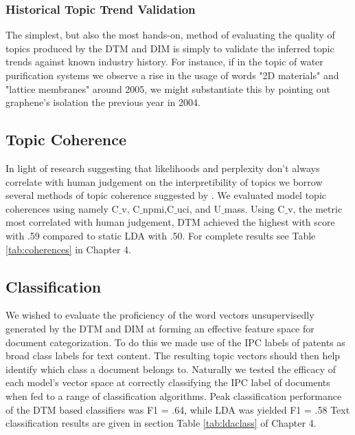 \subsubsection{Historical Topic Trend Validation}
The simplest, but also the most hands-on, method of evaluating the quality of topics produced by the DTM and DIM is simply to validate the inferred topic trends against known industry history. For instance, if in the topic of water purification systems we observe a rise in the usage of words "2D materials" and "lattice membranes" around 2005, we might substantiate this by pointing out graphene's isolation the previous year in 2004.
 

\subsection{Topic Coherence}
In light of research suggesting that likelihoods and perplexity don't always correlate with human judgement on the interpretibility of topics \parencite{Blei:2006:DTM:1143844.1143859} we borrow several methods of topic coherence suggested by \parencite{DBLP:journals/corr/RosnerHRNB14}. We evaluated model topic coherences using namely C$\_$v, C$\_$npmi,C$\_$uci, and U$\_$mass. Using C$\_$v, the metric most correlated with human judgement, DTM achieved the highest with score with .59 compared to static LDA with .50. For complete results see Table \ref{tab:coherences} in Chapter 4.


\subsection{Classification}
We wished to evaluate the proficiency of the word vectors unsupervisedly generated by the DTM and DIM at forming an effective feature space for document categorization. To do this we made use of the IPC labels of patents as broad class labels for text content. The resulting topic vectors should then help identify which class a document belongs to. Naturally we tested the efficacy of each model's vector space at correctly classifying the IPC label of documents when fed to a range of classification algorithms. Peak classification performance of the DTM based classifiers was F1 = .64, while LDA was yielded F1 = .58 Text classification results are given in section Table \ref{tab:ldaclass} of Chapter 4.



